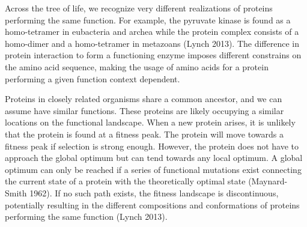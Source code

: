 Across the tree of life, we recognize very different realizations of proteins performing the same function.
For example, the pyruvate kinase is found as a homo-tetramer in eubacteria and archea while the protein complex consists of a homo-dimer and a homo-tetramer in metazoans (Lynch 2013). 
The difference in protein interaction to form a functioning enzyme imposes different constrains on the amino acid sequence, making the usage of amino acids for a protein performing a given function context dependent. 

Proteins in closely related organisms share a common ancestor, and we can assume have similar functions.
These proteins are likely occupying a similar locations on the functional landscape. 
When a new protein arises, it is unlikely that the protein is found at a fitness peak. 
The protein will move towards a fitness peak if selection is strong enough.
However, the protein does not have to approach the global optimum but can tend towards any local optimum.
A global optimum can only be reached if a series of functional mutations exist connecting the current state of a protein with the theoretically optimal state (Maynard-Smith 1962).
If no such path exists, the fitness landscape is discontinuous, potentially resulting in the  different compositions and conformations of proteins performing the same function (Lynch 2013).